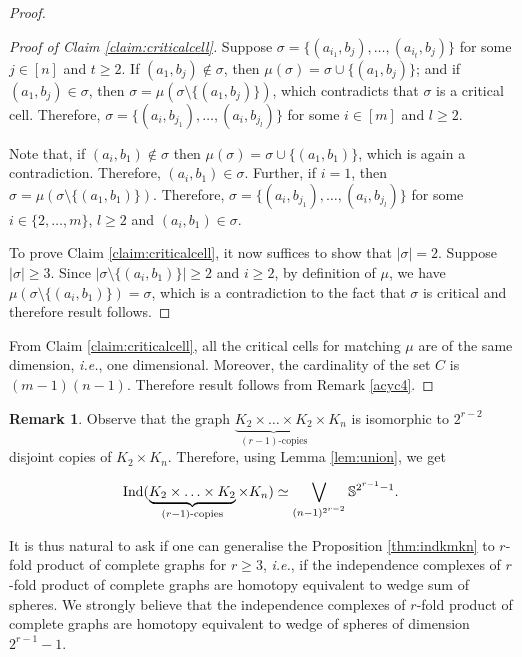 \documentclass[12pt]{article}
\numberwithin{thm}{section}
\theoremstyle{definition}
\newtheorem{rmk}{Remark}
\newcommand{\ind}{{\rm{Ind}}}
\begin{document}
\begin{proof}
\begin{proof}[Proof of Claim \ref{claim:criticalcell}]
Suppose  $\sigma = \{(a_{i_1}, b_{j}), \ldots,(a_{i_t}, b_{j})\}$ for some $j  \in [n]$ and $t \geq 2$. If  $(a_1, b_j) \notin \sigma $, then $\mu(\sigma) = \sigma \cup \{(a_1, b_j)\}$; and if $(a_1, b_j)  \in \sigma $, then $\sigma = \mu(\sigma \setminus \{(a_1, b_j)\})$, which  contradicts that $\sigma$ is a critical cell. Therefore, $\sigma = \{(a_i, b_{j_1}), \ldots,(a_i, b_{j_l})\}$ for some $i \in [m]$ and $l \geq 2$.

Note that, if $(a_i, b_1) \notin \sigma$ then $\mu(\sigma) = \sigma \cup \{(a_1, b_1)\}$, which is again a contradiction. Therefore, $(a_i, b_1) \in \sigma$. Further, if $i=1$, then $\sigma = \mu(\sigma \setminus \{(a_1, b_1)\})$. Therefore, $\sigma = \{(a_i, b_{j_1}), \ldots,(a_i, b_{j_l})\}$ for some $i \in \{2,\ldots,m\}$, $l \geq 2$ and $(a_i, b_1) \in \sigma$.

To prove Claim \ref{claim:criticalcell}, it now suffices to show that $|\sigma|=2$. Suppose $|\sigma| \geq 3$. Since $|\sigma \setminus \{(a_i, b_1)\}| \geq 2$ and $i\geq 2$, by definition of $\mu$, we have $\mu(\sigma \setminus \{(a_i, b_1)\})=\sigma$, which is a contradiction to the fact that $\sigma$ is critical and therefore result follows.
\end{proof}

 From Claim \ref{claim:criticalcell}, all the critical cells for matching $\mu$ are of the same dimension, {\it i.e.}, one dimensional. Moreover, the cardinality of the set $C$ is $(m-1)(n-1)$. Therefore result follows from Remark \ref{acyc4}.
\end{proof}



\begin{rmk} Observe that  the graph $\underbrace{K_2 \times \ldots \times K_2}_{(r-1)\text{-copies}} \times K_n$ is isomorphic to $2^{r-2}$ disjoint copies of $K_2 \times K_n$. Therefore, using Lemma \ref{lem:union}, we get

$$\ind(\underbrace{K_2 \times \ldots \times K_2}_{(r-1)\text{-copies}} \times K_n) \simeq \bigvee\limits_{(n-1)^{2^{r-2}}} \mathbb{S}^{2^{r-1}-1}.$$ 

It is thus natural to ask if one can generalise the Proposition \ref{thm:indkmkn} to $r$-fold product of complete graphs for $r\geq 3$, {\it i.e.}, if the independence complexes of $r$-fold product of complete graphs are homotopy equivalent to wedge sum of spheres. 
We strongly believe that the independence complexes of $r$-fold product of complete graphs are homotopy equivalent to wedge of spheres of dimension $2^{r-1}-1$.
\end{rmk}
\end{document}
